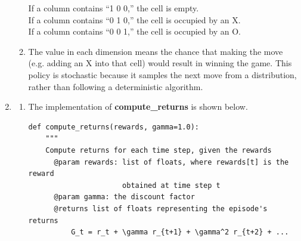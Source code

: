 \documentclass[10pt,letterpaper]{article}
\begin{document}
\begin{enumerate}
\begin{enumerate}
			If a column contains ``1 0 0,'' the cell is empty.\\
			If a column contains ``0 1 0,'' the cell is occupied by an X.\\
			If a column contains ``0 0 1,'' the cell is occupied by an O.
			\item %
			The value in each dimension means the chance that making the move (e.g. adding an X into that cell) would result in winning the game.
			This policy is stochastic because it samples the next move from a distribution, rather than following a deterministic algorithm.
		\end{enumerate}
		\item %
		\begin{enumerate}
			\item %
			The implementation of \textbf{compute\_returns} is shown below.
			\begin{lstlisting}
def compute_returns(rewards, gamma=1.0):
    """
    Compute returns for each time step, given the rewards
      @param rewards: list of floats, where rewards[t] is the reward
                      obtained at time step t
      @param gamma: the discount factor
      @returns list of floats representing the episode's returns
          G_t = r_t + \gamma r_{t+1} + \gamma^2 r_{t+2} + ...


\end{lstlisting}
\end{enumerate}
\end{enumerate}
\end{document}

